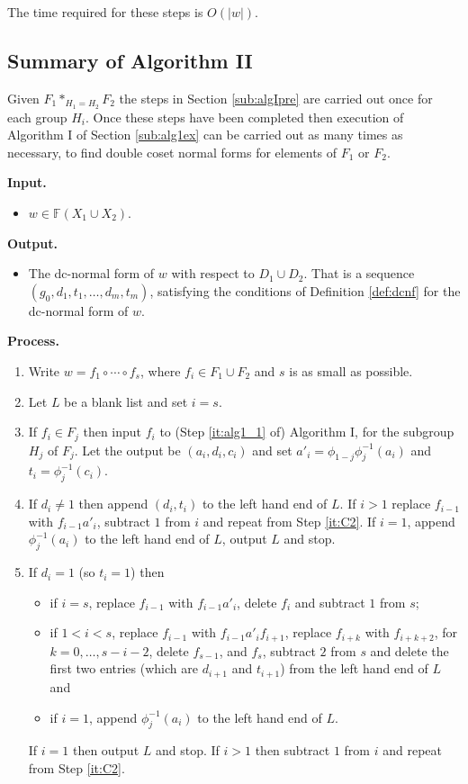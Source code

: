 \documentclass[a4paper,12pt]{article}
\numberwithin{equation}{section}
\numberwithin{figure}{section}
\newcommand{\FF}{\ensuremath{\mathbb{F}}}
\newcommand{\be}{\begin{enumerate}}
\newcommand{\ee}{\end{enumerate}}
\newcommand{\biz}{\begin{itemize}}
\newcommand{\eiz}{\end{itemize}}
\begin{document}
\begin{comp}
The time required for these steps is $O(|w|)$.
\end{comp}

\subsection{Summary of Algorithm II}\label{sub:summaryII}
Given $F_1*_{H_1=H_2} F_2$
 the
steps in  Section \ref{sub:algIpre} are carried out once for
each group $H_i$. Once these steps have been completed
then execution of Algorithm I of Section \ref{sub:alg1ex} can be carried out as many times as necessary,
to find double coset normal forms for elements
of $F_1$ or $F_2$.

\noindent\textbf{Input.}
\biz
\item $w\in \FF(X_1\cup X_2)$.
\eiz
\noindent\textbf{Output.}
\biz
\item The dc-normal form of $w$ with respect to $D_1\cup D_2$.
That is  a sequence $(g_0,d_1,t_1,\ldots, d_m,t_m)$, satisfying 
the conditions of Definition \ref{def:dcnf} for the dc-normal form of $w$. 
\eiz
\noindent\textbf{Process.}
\be[{C}1]
\item\label{it:alg2_start} Write $w=f_1\circ \cdots \circ f_s$, where 
$f_i\in F_1\cup F_2$ and $s$ is as small as possible. 
\item\label{it:C1} Let $L$ be a blank list and  set $i=s$. 
\item\label{it:C2}  
If $f_i\in F_j$ then 
input $f_i$ to (Step \ref{it:alg1_1} of) Algorithm I, for the subgroup
$H_j$ of $F_j$. Let the output be $(a_i,d_i,c_i)$ and 
set $a'_i= \phi_{1-j}\phi_j^{-1}(a_i)$ and $t_i=\phi_j^{-1}(c_i)$.
\item\label{it:C3}
If $d_i\neq 1$ then append $(d_i,t_i)$ to the left hand end of $L$. 
If $i>1$ replace $f_{i-1}$ with $f_{i-1}a'_i$, subtract $1$ from 
$i$ and repeat from Step \ref{it:C2}. If $i=1$, append $\phi_j^{-1}(a_i)$ 
to the 
left hand end of $L$, output $L$ and stop. 
\item If $d_i=1$ (so $t_i=1$) then 
\begin{itemize}
\item if $i=s$, replace $f_{i-1}$ with $f_{i-1}a'_i$, delete $f_i$ and subtract $1$ from $s$;
\item if $1<i<s$, replace $f_{i-1}$ with $f_{i-1}a'_if_{i+1}$,  
replace $f_{i+k}$ with $f_{i+k+2}$, for $k=0,\ldots, s-i-2$, delete 
$f_{s-1}$, and $f_s$, subtract $2$ from $s$  and
delete the first two entries (which are $d_{i+1}$ and $t_{i+1}$) from
the left hand end of  
$L$ and 
\item if $i=1$, append $\phi_j^{-1}(a_i)$ to the left hand end of $L$.
\end{itemize}
If $i=1$ then output $L$ and stop. 
If $i>1$ then subtract $1$ from $i$ and repeat from Step \ref{it:C2}.
\ee
\end{document}
